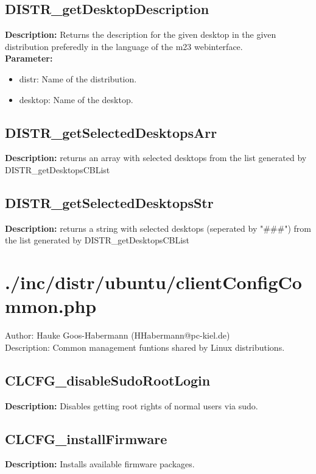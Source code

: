 \subsection{DISTR\_getDesktopDescription}
\textbf{Description:} Returns the description for the given desktop in the given distribution preferedly in the language of the m23 webinterface.\\
\textbf{Parameter:}
\begin{itemize}
\item distr: Name of the distribution.
\item desktop: Name of the desktop.
\end{itemize}

\subsection{DISTR\_getSelectedDesktopsArr}
\textbf{Description:} returns an array with selected desktops from the list generated by DISTR\_getDesktopsCBList\\

\subsection{DISTR\_getSelectedDesktopsStr}
\textbf{Description:} returns a string with selected desktops (seperated by "\#\#\#") from the list generated by DISTR\_getDesktopsCBList\\

\newpage\section{./inc/distr/ubuntu/clientConfigCommon.php}
 Author: Hauke Goos-Habermann (HHabermann@pc-kiel.de)\\
 Description: Common management funtions shared by Linux distributions.\\

\subsection{CLCFG\_disableSudoRootLogin}
\textbf{Description:} Disables getting root rights of normal users via sudo.\\

\subsection{CLCFG\_installFirmware}
\textbf{Description:} Installs available firmware packages.\\

